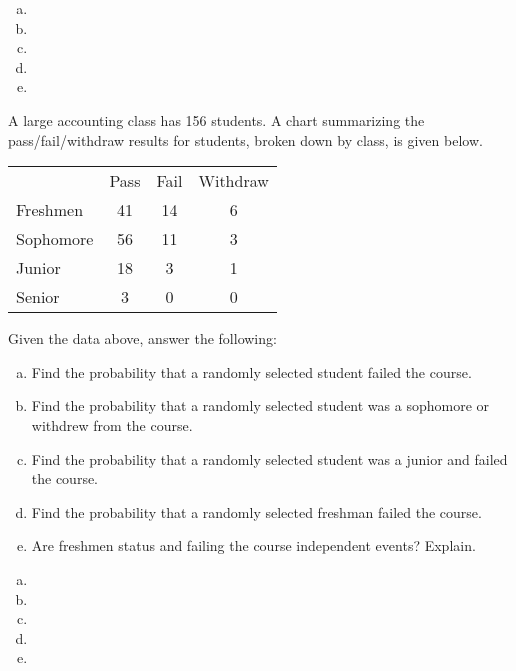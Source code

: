 \documentclass[11pt,letterpaper]{article}
\begin{document}
\sol 
\begin{enumerate}[(a)]
\item 
\item 
\item 
\item 
\item 
\end{enumerate}



\newpage



 A large accounting class has 156 students. A chart summarizing the pass/fail/withdraw results for students, broken down by class, is given below. \par
	\begin{table}[H]
	\centering
	\begin{tabular}{lccc}
	& Pass & Fail & Withdraw \\ \cline{2-4} 
	\multicolumn{1}{l|}{Freshmen} & \multicolumn{1}{c|}{41} & \multicolumn{1}{c|}{14} & \multicolumn{1}{c|}{6} \\ \cline{2-4} 
	\multicolumn{1}{l|}{Sophomore} & \multicolumn{1}{c|}{56} & \multicolumn{1}{c|}{11} & \multicolumn{1}{c|}{3} \\ \cline{2-4} 
	\multicolumn{1}{l|}{Junior} & \multicolumn{1}{c|}{18} & \multicolumn{1}{c|}{3} & \multicolumn{1}{c|}{1} \\ \cline{2-4} 
	\multicolumn{1}{l|}{Senior} & \multicolumn{1}{c|}{3} & \multicolumn{1}{c|}{0} & \multicolumn{1}{c|}{0} \\ \cline{2-4} 
	\end{tabular}
	\end{table} \pspace
Given the data above, answer the following:
	\begin{enumerate}[(a)]
	\item Find the probability that a randomly selected student failed the course.
	\item Find the probability that a randomly selected student was a sophomore or withdrew from the course.
	\item Find the probability that a randomly selected student was a junior and failed the course.
	\item Find the probability that a randomly selected freshman failed the course.
	\item Are freshmen status and failing the course independent events? Explain. 
	\end{enumerate} \pspace

\sol 
\begin{enumerate}[(a)]
\item 
\item 
\item 
\item 
\item 
\end{enumerate}
\end{document}
